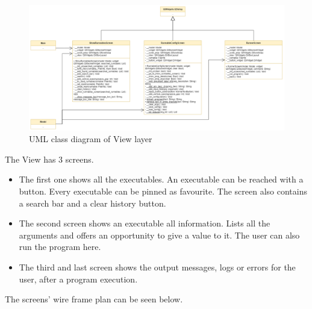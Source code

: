 \documentclass{article}
\begin{document}
\begin{figure}[h]
    \centering
    \includegraphics[width=1\linewidth]{img/class_diagram_view.drawio.png}
    \caption{UML class diagram of View layer}
    \label{fig:enter-label}
\end{figure}

The View has 3 screens.
\begin{itemize}
    \item The first one shows all the executables. An executable can be reached with a button. Every executable can be pinned as favourite. The screen also contains a search bar and a clear history button.
    \item The second screen shows an executable all information. Lists all the arguments and offers an opportunity to give a value to it. The user can also run the program here.
    \item The third and last screen shows the output messages, logs or errors for the user, after a program execution.
\end{itemize}
The screens' wire frame plan can be seen below.
\end{document}
